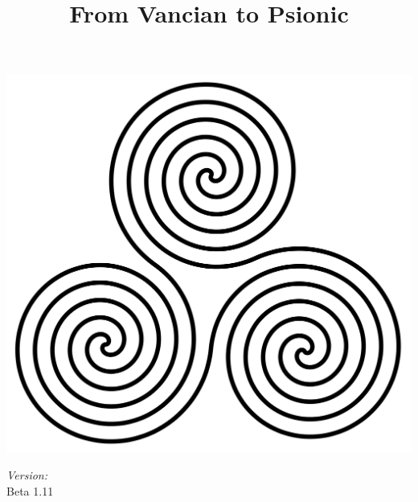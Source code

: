 \documentclass[a4paper,10pt]{article}
\title{From Vancian to Psionic}
\date{}
\author{}
\begin{document}
\begin{titlepage}
\maketitle
\thispagestyle{empty}
\includegraphics[width=\textwidth]{Pics/TripleSpiral.png}
\vfill
\begin{flushright} \large
\emph{Version:} \\
Beta 1.11
\end{flushright}
\end{titlepage}
\end{document}

